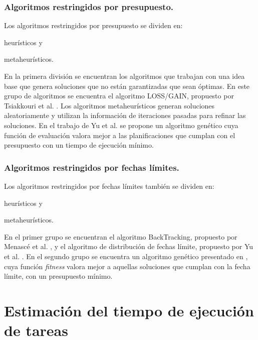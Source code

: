 \subsubsection{Algoritmos restringidos por presupuesto.}

Los algoritmos restringidos por presupuesto se dividen en: 
\begin{enumerate*}[label=\alph*)]
\item{heurísticos y}
\item{metaheurísticos.}
\end{enumerate*}

En la primera división se encuentran los algoritmos que trabajan con una idea base que genera soluciones que no están garantizadas que sean óptimas. En este grupo de algoritmos se encuentra el algoritmo LOSS/GAIN, propuesto por Tsiakkouri et al. \cite{sakellariou2007scheduling}. Los algoritmos metaheurísticos generan soluciones aleatoriamente y utilizan la información de iteraciones pasadas para refinar las soluciones. En el trabajo de Yu et al. \cite{yu2006scheduling} se propone un algoritmo genético cuya función de evaluación valora mejor a las planificaciones que cumplan con el presupuesto con un tiempo de ejecución mínimo.


\subsubsection{Algoritmos restringidos por fechas límites.}

Los algoritmos restringidos por fechas límites también se dividen en:
\begin{enumerate*}[label=\alph*)]
\item{heurísticos y}
\item{metaheurísticos.}
\end{enumerate*}

En el primer grupo se encuentran el algoritmo BackTracking, propuesto por Menascé et al. \cite{menasce2004framework}, y el algoritmo de distribución de fechas límite, propuesto por Yu et al. \cite{yu2005cost}. En el segundo grupo se encuentra un algoritmo genético presentado en \cite{yu2006scheduling}, cuya función \emph{fitness} valora mejor a aquellas soluciones que cumplan con la fecha límite, con un presupuesto mínimo.

	
\section{Estimación del tiempo de ejecuci\'on de tareas}

